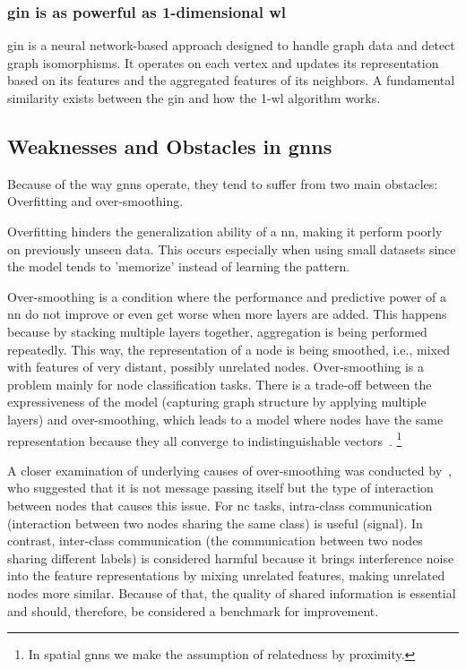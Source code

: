 \subsubsection{\acl*{gin} is as powerful as 1-dimensional \acs*{wl}}
\Ac{gin} is a neural network-based approach designed to handle graph data and detect graph isomorphisms.
It operates on each vertex and updates its representation based on its features and the aggregated features of its neighbors.
A fundamental similarity exists between the \ac{gin} and how the 1-\ac{wl} algorithm works.

\subsection{Weaknesses and Obstacles in \acsp*{gnn}}
\label{sec:related:pred:typical}
Because of the way \acp{gnn} operate, they tend to suffer from two main obstacles:
Overfitting and over-smoothing.

Overfitting hinders the generalization ability of a \acf{nn}, making it perform poorly on previously unseen data.
This occurs especially when using small datasets since the model tends to 'memorize' instead of learning the pattern.

Over-smoothing is a condition where the performance and predictive power of a \ac{nn} do not improve or even get worse when more layers are added.
This happens because by stacking multiple layers together, aggregation is being performed repeatedly.
This way, the representation of a node is being smoothed, i.e., mixed with features of very distant, possibly unrelated nodes.
Over-smoothing is a problem mainly for node classification tasks. There is a trade-off between the expressiveness of the model (capturing graph structure by applying multiple layers) and over-smoothing, which leads to a model where nodes have the same representation because they all converge to indistinguishable vectors~\cite{Zhou2020,Hasanzadeh2020}.%
\footnote{In spatial \acp{gnn} we make the assumption of relatedness by proximity.}

A closer examination of underlying causes of over-smoothing was conducted by~\citet {Chen2020}, who suggested that it is not message passing itself but the type of interaction between nodes that causes this issue.
For \acf{nc} tasks, intra-class communication (interaction between two nodes sharing the same class) is useful (signal).
In contrast, inter-class communication (the communication between two nodes sharing different labels) is considered harmful because it brings interference noise into the feature representations by mixing unrelated features, making unrelated nodes more similar.
Because of that, the quality of shared information is essential and should, therefore, be considered a benchmark for improvement.

